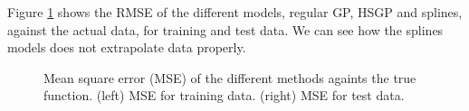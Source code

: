\documentclass[]{interact}
\theoremstyle{plain}%
\theoremstyle{definition}
\theoremstyle{remark}
\begin{document}
Figure \ref{fig14_MSE_train_gaydata} shows the RMSE of the different models, regular GP, HSGP and splines, against the actual data, for training and test data. We can see how the splines models does not extrapolate data properly.

\begin{figure}[H]
\centering
{}
\caption{Mean square error (MSE) of the different methods againts the true function. (left) MSE for training data. (right) MSE for test data.}
  \label{fig14_MSE_train_gaydata}
\end{figure}
\end{document}
